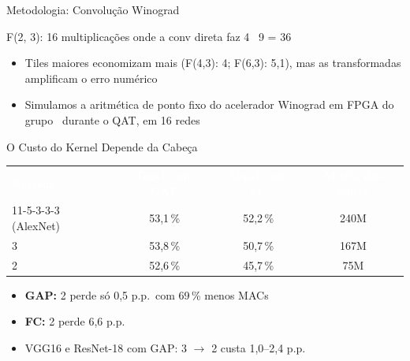 \documentclass[t,aspectratio=169,12pt,xcolor=table]{beamer}
\newcommand{\by}{\texttimes}
\newcommand{\cab}{\rowcolor{ardosia}}          %
\newcommand{\bc}[1]{\textcolor{white}{\textbf{#1}}}
\begin{document}
\begin{frame}{Metodologia: Convolução Winograd}
  \centering
  \par\medskip
  {\small F(2\by2, 3\by3): 16 multiplicações onde a conv direta faz 4 \by\ 9 = 36~\cite{lavin}}
  \raggedright
  \begin{itemize}\setlength{\itemsep}{0.35em}
    \item Tiles maiores economizam mais (F(4,3): 4\by; F(6,3): 5,1\by), mas as transformadas amplificam o erro numérico~\cite{barabasz}
    \item Simulamos a aritmética de ponto fixo do acelerador Winograd em FPGA do grupo~\cite{schmitz} durante o QAT, em 16 redes
  \end{itemize}
\end{frame}

\begin{frame}{O Custo do Kernel Depende da Cabeça}
  \begin{center}\small
  \begin{tabular}{lccc}
    \cab \bc{Kernels} & \bc{Top-1 com GAP} & \bc{Top-1 com FC} & \bc{MACs das convs} \\
    11-5-3-3-3 (AlexNet) & 53,1\,\% & 52,2\,\% & 240M \\
    \rowcolor{linha}
    3\by3 & 53,8\,\% & 50,7\,\% & 167M \\
    2\by2 & 52,6\,\% & 45,7\,\% & 75M \\
  \end{tabular}
  \end{center}
  \begin{itemize}\setlength{\itemsep}{0.3em}
    \item \textbf{GAP:} 2\by2 perde só 0,5 p.p.\ com 69\,\% menos MACs
    \item \textbf{FC:} 2\by2 perde 6,6 p.p.
    \item VGG16 e ResNet-18 com GAP: 3\by3 $\rightarrow$ 2\by2 custa 1,0--2,4 p.p.
  \end{itemize}
\end{frame}
\end{document}
